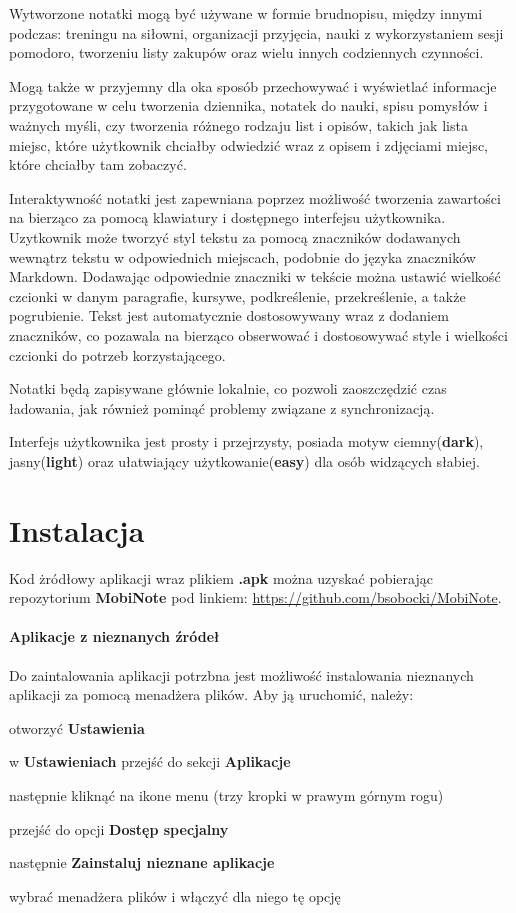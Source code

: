 \documentclass[shortabstract]{iithesis}
\begin{document}
Wytworzone notatki mogą być używane w formie brudnopisu, między innymi podczas: treningu na siłowni, organizacji przyjęcia, nauki z wykorzystaniem sesji pomodoro, tworzeniu listy zakupów oraz wielu innych codziennych czynności.

Mogą także w przyjemny dla oka sposób przechowywać i wyświetlać informacje przygotowane w celu tworzenia dziennika, notatek do nauki, spisu pomysłów i ważnych myśli, czy tworzenia różnego rodzaju list i opisów, takich jak lista miejsc, które użytkownik chciałby odwiedzić wraz z opisem i zdjęciami miejsc, które chciałby tam zobaczyć.

Interaktywność notatki jest zapewniana poprzez możliwość tworzenia zawartości na bierząco za pomocą klawiatury i dostępnego interfejsu użytkownika.
Uzytkownik może tworzyć styl tekstu za pomocą znaczników dodawanych wewnątrz tekstu w odpowiednich miejscach, podobnie do języka znaczników Markdown.
Dodawając odpowiednie znaczniki w tekście można ustawić wielkość czcionki w danym paragrafie, kursywe, podkreślenie, przekreślenie, a także pogrubienie.
Tekst jest automatycznie dostosowywany wraz z dodaniem znaczników, co pozawala na bierząco obserwować i dostosowywać style i wielkości czcionki do potrzeb korzystającego.

Notatki będą zapisywane głównie lokalnie, co pozwoli zaoszczędzić czas ładowania, jak również pominąć problemy związane z synchronizacją.

Interfejs użytkownika jest prosty i przejrzysty, posiada motyw ciemny(\textbf{dark}), jasny(\textbf{light}) oraz ułatwiający użytkowanie(\textbf{easy}) dla osób widzących słabiej.

\chapter{Instalacja}

Kod żródłowy aplikacji wraz plikiem \textbf{.apk} można uzyskać pobierając repozytorium \textbf{MobiNote} pod linkiem:
\url{https://github.com/bsobocki/MobiNote}.

\subsubsection{Aplikacje z nieznanych źródeł}
Do zaintalowania aplikacji potrzbna jest możliwość instalowania nieznanych aplikacji za pomocą menadżera plików.
Aby ją uruchomić, należy:
\begin{compactitem}
    \item otworzyć \textbf{Ustawienia}
    \item w \textbf{Ustawieniach} przejść do sekcji \textbf{Aplikacje}
    \item następnie kliknąć na ikone menu (trzy kropki w prawym górnym rogu)
    \item przejść do opcji \textbf{Dostęp specjalny}
    \item następnie \textbf{Zainstaluj nieznane aplikacje}
    \item wybrać menadżera plików i włączyć dla niego tę opcję
\end{compactitem}
\end{document}
